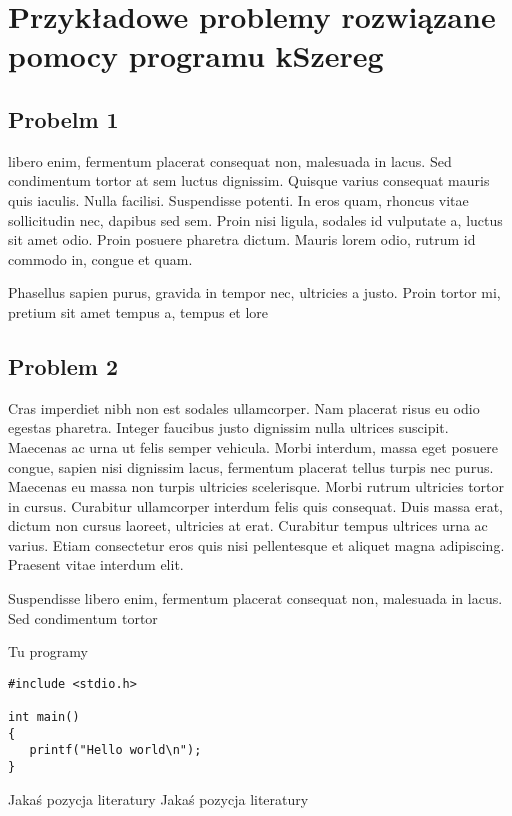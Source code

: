 \documentclass[twoside]{pracaInzynierskaMS}
\begin{document}
\section    [Przykładowe problemy \ldots]
            {Przykładowe problemy rozwiązane pomocy programu kSzereg}
       
\subsection {Probelm 1}


 libero enim, fermentum placerat consequat non, malesuada in lacus. Sed condimentum tortor at sem luctus dignissim. Quisque varius consequat mauris quis iaculis. Nulla facilisi. Suspendisse potenti. In eros quam, rhoncus vitae sollicitudin nec, dapibus sed sem. Proin nisi ligula, sodales id vulputate a, luctus sit amet odio. Proin posuere pharetra dictum. Mauris lorem odio, rutrum id commodo in, congue et quam. 

 Phasellus sapien purus, gravida in tempor nec, ultricies a justo. Proin tortor mi, pretium sit amet tempus a, tempus et lore

\newpage
\subsection {Problem 2}


Cras imperdiet nibh non est sodales ullamcorper. Nam placerat risus eu odio egestas pharetra. Integer faucibus justo dignissim nulla ultrices suscipit. Maecenas ac urna ut felis semper vehicula. Morbi interdum, massa eget posuere congue, sapien nisi dignissim lacus, fermentum placerat tellus turpis nec purus. Maecenas eu massa non turpis ultricies scelerisque. Morbi rutrum ultricies tortor in cursus. Curabitur ullamcorper interdum felis quis consequat. Duis massa erat, dictum non cursus laoreet, ultricies at erat. Curabitur tempus ultrices urna ac varius. Etiam consectetur eros quis nisi pellentesque et aliquet magna adipiscing. Praesent vitae interdum elit. 

 Suspendisse libero enim, fermentum placerat consequat non, malesuada in lacus. Sed condimentum tortor


Tu programy

\begin{verbatim}
#include <stdio.h>

int main()
{
   printf("Hello world\n");
}
\end{verbatim}       
       
       
       
\begin{thebibliography}{12}

 Jakaś pozycja literatury
 Jakaś pozycja literatury

\end{thebibliography}
\end{document}
